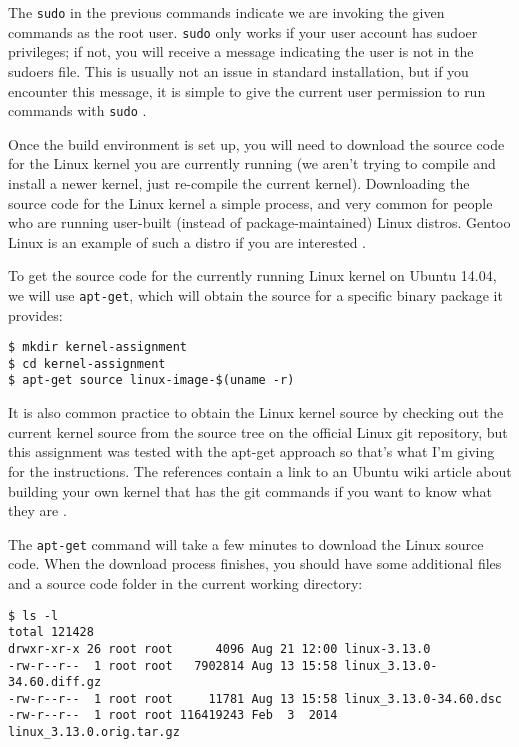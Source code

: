 \documentclass[11pt]{article}
\begin{document}
The \texttt{sudo} in the previous commands indicate we are invoking the given commands as the root user. \texttt{sudo} only works if your user account has sudoer privileges; if not, you will receive a message indicating the user is not in the sudoers file. This is usually not an issue in standard installation, but if you encounter this message, it is simple to give the current user permission to run commands with \texttt{sudo} \cite{sudoers}.

Once the build environment is set up, you will need to download the source code for the Linux kernel you are currently running (we aren't trying to compile and install a newer kernel, just re-compile the current kernel). Downloading the source code for the Linux kernel a simple process, and very common for people who are running user-built (instead of package-maintained) Linux distros. Gentoo Linux is an example of such a distro if you are interested \cite{gentoo}.

To get the source code for the currently running Linux kernel on Ubuntu 14.04, we will use \texttt{apt-get}, which will obtain the source for a specific binary package it provides: 

\begin{verbatim}
$ mkdir kernel-assignment
$ cd kernel-assignment
$ apt-get source linux-image-$(uname -r)
\end{verbatim}

It is also common practice to obtain the Linux kernel source by checking out the current kernel source from the source tree on the official Linux git repository, but this assignment was tested with the apt-get approach so that's what I'm giving for the instructions. The references contain a link to an Ubuntu wiki article about building your own kernel that has the git commands if you want to know what they are \cite{ubuntukernel}.

The \texttt{apt-get} command will take a few minutes to download the Linux source code. When the download process finishes, you should have some additional files and a source code folder in the current working directory:

\begin{verbatim}
$ ls -l
total 121428
drwxr-xr-x 26 root root      4096 Aug 21 12:00 linux-3.13.0
-rw-r--r--  1 root root   7902814 Aug 13 15:58 linux_3.13.0-34.60.diff.gz
-rw-r--r--  1 root root     11781 Aug 13 15:58 linux_3.13.0-34.60.dsc
-rw-r--r--  1 root root 116419243 Feb  3  2014 linux_3.13.0.orig.tar.gz
\end{verbatim}
\end{document}

